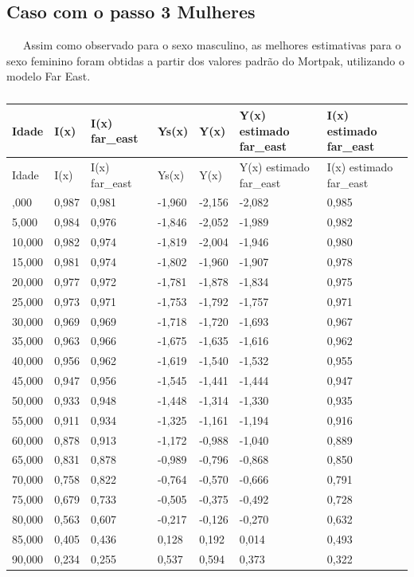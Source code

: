 \documentclass[
  12pt,
  a4paper,
]{scrreprt}
\begin{document}
\subsection{Caso com o passo 3
Mulheres}\label{caso-com-o-passo-3-mulheres}

~~~Assim como observado para o sexo masculino, as melhores estimativas
para o sexo feminino foram obtidas a partir dos valores padrão do
Mortpak, utilizando o modelo Far East.

\begin{longtable}[]{@{}lllllll@{}}
\caption{}\label{T_44739}\tabularnewline
\toprule\noalign{}
Idade & I(x) & I(x) far\_east & Ys(x) & Y(x) & Y(x) estimado far\_east &
I(x) estimado far\_east \\
\midrule\noalign{}
\endfirsthead
\toprule\noalign{}
Idade & I(x) & I(x) far\_east & Ys(x) & Y(x) & Y(x) estimado far\_east &
I(x) estimado far\_east \\
\midrule\noalign{}
\endhead
\bottomrule\noalign{}
\endlastfoot
1,000 & 0,987 & 0,981 & -1,960 & -2,156 & -2,082 & 0,985 \\
5,000 & 0,984 & 0,976 & -1,846 & -2,052 & -1,989 & 0,982 \\
10,000 & 0,982 & 0,974 & -1,819 & -2,004 & -1,946 & 0,980 \\
15,000 & 0,981 & 0,974 & -1,802 & -1,960 & -1,907 & 0,978 \\
20,000 & 0,977 & 0,972 & -1,781 & -1,878 & -1,834 & 0,975 \\
25,000 & 0,973 & 0,971 & -1,753 & -1,792 & -1,757 & 0,971 \\
30,000 & 0,969 & 0,969 & -1,718 & -1,720 & -1,693 & 0,967 \\
35,000 & 0,963 & 0,966 & -1,675 & -1,635 & -1,616 & 0,962 \\
40,000 & 0,956 & 0,962 & -1,619 & -1,540 & -1,532 & 0,955 \\
45,000 & 0,947 & 0,956 & -1,545 & -1,441 & -1,444 & 0,947 \\
50,000 & 0,933 & 0,948 & -1,448 & -1,314 & -1,330 & 0,935 \\
55,000 & 0,911 & 0,934 & -1,325 & -1,161 & -1,194 & 0,916 \\
60,000 & 0,878 & 0,913 & -1,172 & -0,988 & -1,040 & 0,889 \\
65,000 & 0,831 & 0,878 & -0,989 & -0,796 & -0,868 & 0,850 \\
70,000 & 0,758 & 0,822 & -0,764 & -0,570 & -0,666 & 0,791 \\
75,000 & 0,679 & 0,733 & -0,505 & -0,375 & -0,492 & 0,728 \\
80,000 & 0,563 & 0,607 & -0,217 & -0,126 & -0,270 & 0,632 \\
85,000 & 0,405 & 0,436 & 0,128 & 0,192 & 0,014 & 0,493 \\
90,000 & 0,234 & 0,255 & 0,537 & 0,594 & 0,373 & 0,322 \\
\end{longtable}
\end{document}

